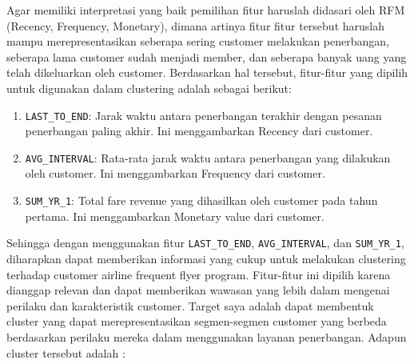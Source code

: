 Agar memiliki interpretasi yang baik pemilihan fitur haruslah didasari oleh RFM (Recency, Frequency, Monetary), dimana artinya fitur fitur tersebut haruslah mampu merepresentasikan seberapa sering customer melakukan penerbangan, seberapa lama customer sudah menjadi member, dan seberapa banyak uang yang telah dikeluarkan oleh customer. Berdasarkan hal tersebut, fitur-fitur yang dipilih untuk digunakan dalam clustering adalah sebagai berikut:

\begin{enumerate}
    \item \texttt{LAST\_TO\_END}: Jarak waktu antara penerbangan terakhir dengan pesanan penerbangan paling akhir. Ini menggambarkan Recency dari customer.
    \item \texttt{AVG\_INTERVAL}: Rata-rata jarak waktu antara penerbangan yang dilakukan oleh customer. Ini menggambarkan Frequency dari customer.
    \item \texttt{SUM\_YR\_1}: Total fare revenue yang dihasilkan oleh customer pada tahun pertama. Ini menggambarkan Monetary value dari customer.
\end{enumerate}

Sehingga dengan menggunakan fitur \texttt{LAST\_TO\_END}, \texttt{AVG\_INTERVAL}, dan \texttt{SUM\_YR\_1}, diharapkan dapat memberikan informasi yang cukup untuk melakukan clustering terhadap customer airline frequent flyer program. Fitur-fitur ini dipilih karena dianggap relevan dan dapat memberikan wawasan yang lebih dalam mengenai perilaku dan karakteristik customer. Target saya adalah dapat membentuk cluster yang dapat merepresentasikan segmen-segmen customer yang berbeda berdasarkan perilaku mereka dalam menggunakan layanan penerbangan. Adapun cluster tersebut adalah :

